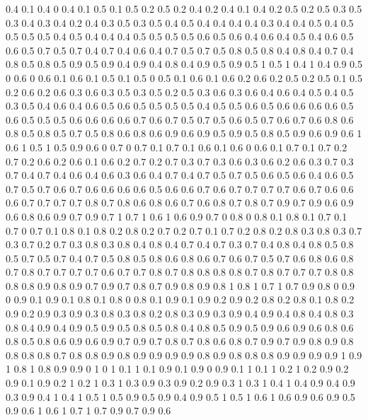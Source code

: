 0.4 0.1
0.4 0
0.4 0.1
0.5 0.1
0.5 0.2
0.5 0.2
0.4 0.2
0.4 0.1
0.4 0.2
0.5 0.2
0.5 0.3
0.5 0.3
0.4 0.3
0.4 0.2
0.4 0.3
0.5 0.3
0.5 0.4
0.5 0.4
0.4 0.4
0.4 0.3
0.4 0.4
0.5 0.4
0.5 0.5
0.5 0.5
0.4 0.5
0.4 0.4
0.4 0.5
0.5 0.5
0.5 0.6
0.5 0.6
0.4 0.6
0.4 0.5
0.4 0.6
0.5 0.6
0.5 0.7
0.5 0.7
0.4 0.7
0.4 0.6
0.4 0.7
0.5 0.7
0.5 0.8
0.5 0.8
0.4 0.8
0.4 0.7
0.4 0.8
0.5 0.8
0.5 0.9
0.5 0.9
0.4 0.9
0.4 0.8
0.4 0.9
0.5 0.9
0.5 1
0.5 1
0.4 1
0.4 0.9
0.5 0
0.6 0
0.6 0.1
0.6 0.1
0.5 0.1
0.5 0
0.5 0.1
0.6 0.1
0.6 0.2
0.6 0.2
0.5 0.2
0.5 0.1
0.5 0.2
0.6 0.2
0.6 0.3
0.6 0.3
0.5 0.3
0.5 0.2
0.5 0.3
0.6 0.3
0.6 0.4
0.6 0.4
0.5 0.4
0.5 0.3
0.5 0.4
0.6 0.4
0.6 0.5
0.6 0.5
0.5 0.5
0.5 0.4
0.5 0.5
0.6 0.5
0.6 0.6
0.6 0.6
0.5 0.6
0.5 0.5
0.5 0.6
0.6 0.6
0.6 0.7
0.6 0.7
0.5 0.7
0.5 0.6
0.5 0.7
0.6 0.7
0.6 0.8
0.6 0.8
0.5 0.8
0.5 0.7
0.5 0.8
0.6 0.8
0.6 0.9
0.6 0.9
0.5 0.9
0.5 0.8
0.5 0.9
0.6 0.9
0.6 1
0.6 1
0.5 1
0.5 0.9
0.6 0
0.7 0
0.7 0.1
0.7 0.1
0.6 0.1
0.6 0
0.6 0.1
0.7 0.1
0.7 0.2
0.7 0.2
0.6 0.2
0.6 0.1
0.6 0.2
0.7 0.2
0.7 0.3
0.7 0.3
0.6 0.3
0.6 0.2
0.6 0.3
0.7 0.3
0.7 0.4
0.7 0.4
0.6 0.4
0.6 0.3
0.6 0.4
0.7 0.4
0.7 0.5
0.7 0.5
0.6 0.5
0.6 0.4
0.6 0.5
0.7 0.5
0.7 0.6
0.7 0.6
0.6 0.6
0.6 0.5
0.6 0.6
0.7 0.6
0.7 0.7
0.7 0.7
0.6 0.7
0.6 0.6
0.6 0.7
0.7 0.7
0.7 0.8
0.7 0.8
0.6 0.8
0.6 0.7
0.6 0.8
0.7 0.8
0.7 0.9
0.7 0.9
0.6 0.9
0.6 0.8
0.6 0.9
0.7 0.9
0.7 1
0.7 1
0.6 1
0.6 0.9
0.7 0
0.8 0
0.8 0.1
0.8 0.1
0.7 0.1
0.7 0
0.7 0.1
0.8 0.1
0.8 0.2
0.8 0.2
0.7 0.2
0.7 0.1
0.7 0.2
0.8 0.2
0.8 0.3
0.8 0.3
0.7 0.3
0.7 0.2
0.7 0.3
0.8 0.3
0.8 0.4
0.8 0.4
0.7 0.4
0.7 0.3
0.7 0.4
0.8 0.4
0.8 0.5
0.8 0.5
0.7 0.5
0.7 0.4
0.7 0.5
0.8 0.5
0.8 0.6
0.8 0.6
0.7 0.6
0.7 0.5
0.7 0.6
0.8 0.6
0.8 0.7
0.8 0.7
0.7 0.7
0.7 0.6
0.7 0.7
0.8 0.7
0.8 0.8
0.8 0.8
0.7 0.8
0.7 0.7
0.7 0.8
0.8 0.8
0.8 0.9
0.8 0.9
0.7 0.9
0.7 0.8
0.7 0.9
0.8 0.9
0.8 1
0.8 1
0.7 1
0.7 0.9
0.8 0
0.9 0
0.9 0.1
0.9 0.1
0.8 0.1
0.8 0
0.8 0.1
0.9 0.1
0.9 0.2
0.9 0.2
0.8 0.2
0.8 0.1
0.8 0.2
0.9 0.2
0.9 0.3
0.9 0.3
0.8 0.3
0.8 0.2
0.8 0.3
0.9 0.3
0.9 0.4
0.9 0.4
0.8 0.4
0.8 0.3
0.8 0.4
0.9 0.4
0.9 0.5
0.9 0.5
0.8 0.5
0.8 0.4
0.8 0.5
0.9 0.5
0.9 0.6
0.9 0.6
0.8 0.6
0.8 0.5
0.8 0.6
0.9 0.6
0.9 0.7
0.9 0.7
0.8 0.7
0.8 0.6
0.8 0.7
0.9 0.7
0.9 0.8
0.9 0.8
0.8 0.8
0.8 0.7
0.8 0.8
0.9 0.8
0.9 0.9
0.9 0.9
0.8 0.9
0.8 0.8
0.8 0.9
0.9 0.9
0.9 1
0.9 1
0.8 1
0.8 0.9
0.9 0
1 0
1 0.1
1 0.1
0.9 0.1
0.9 0
0.9 0.1
1 0.1
1 0.2
1 0.2
0.9 0.2
0.9 0.1
0.9 0.2
1 0.2
1 0.3
1 0.3
0.9 0.3
0.9 0.2
0.9 0.3
1 0.3
1 0.4
1 0.4
0.9 0.4
0.9 0.3
0.9 0.4
1 0.4
1 0.5
1 0.5
0.9 0.5
0.9 0.4
0.9 0.5
1 0.5
1 0.6
1 0.6
0.9 0.6
0.9 0.5
0.9 0.6
1 0.6
1 0.7
1 0.7
0.9 0.7
0.9 0.6
